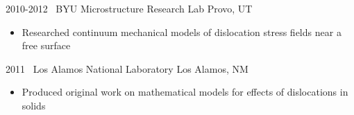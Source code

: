 \begin{entrylist}
{2010-2012}
{\byu~BYU Microstructure Research Lab}
{Provo, UT}
{
\begin{itemize}
	\item Researched continuum mechanical models of dislocation stress fields near a free surface
\end{itemize}
}
\entry
{2011}
{\losalamos~Los Alamos National Laboratory}
{Los Alamos, NM}
{
\begin{itemize}
	\item Produced original work on mathematical models for effects of dislocations in solids
\end{itemize}
}
\end{entrylist}